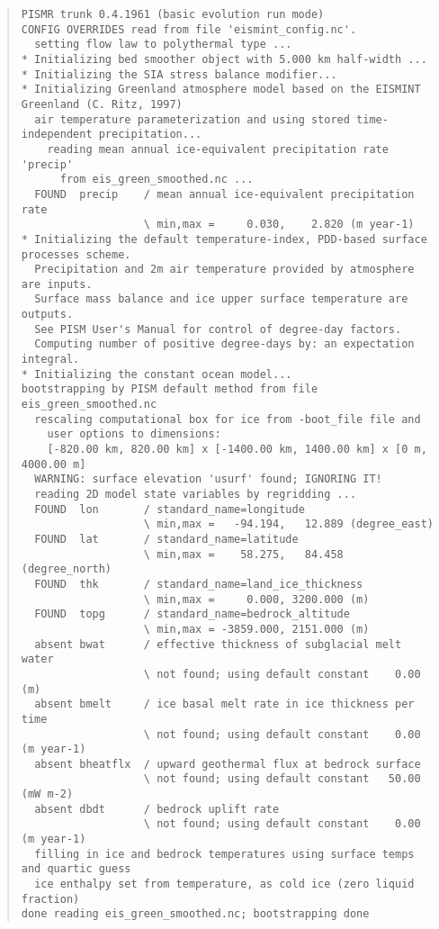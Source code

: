 \begin{table}
\centering
\scriptsize
\begin{quote}
\begin{verbatim}
PISMR trunk 0.4.1961 (basic evolution run mode)
CONFIG OVERRIDES read from file 'eismint_config.nc'.
  setting flow law to polythermal type ...
* Initializing bed smoother object with 5.000 km half-width ...
* Initializing the SIA stress balance modifier...
* Initializing Greenland atmosphere model based on the EISMINT Greenland (C. Ritz, 1997)
  air temperature parameterization and using stored time-independent precipitation...
    reading mean annual ice-equivalent precipitation rate 'precip'
      from eis_green_smoothed.nc ... 
  FOUND  precip    / mean annual ice-equivalent precipitation rate
                   \ min,max =     0.030,    2.820 (m year-1)
* Initializing the default temperature-index, PDD-based surface processes scheme.
  Precipitation and 2m air temperature provided by atmosphere are inputs.
  Surface mass balance and ice upper surface temperature are outputs.
  See PISM User's Manual for control of degree-day factors.
  Computing number of positive degree-days by: an expectation integral.
* Initializing the constant ocean model...
bootstrapping by PISM default method from file eis_green_smoothed.nc
  rescaling computational box for ice from -boot_file file and
    user options to dimensions:
    [-820.00 km, 820.00 km] x [-1400.00 km, 1400.00 km] x [0 m, 4000.00 m]
  WARNING: surface elevation 'usurf' found; IGNORING IT!
  reading 2D model state variables by regridding ...
  FOUND  lon       / standard_name=longitude 
                   \ min,max =   -94.194,   12.889 (degree_east)
  FOUND  lat       / standard_name=latitude  
                   \ min,max =    58.275,   84.458 (degree_north)
  FOUND  thk       / standard_name=land_ice_thickness
                   \ min,max =     0.000, 3200.000 (m)
  FOUND  topg      / standard_name=bedrock_altitude
                   \ min,max = -3859.000, 2151.000 (m)
  absent bwat      / effective thickness of subglacial melt water
                   \ not found; using default constant    0.00 (m)
  absent bmelt     / ice basal melt rate in ice thickness per time
                   \ not found; using default constant    0.00 (m year-1)
  absent bheatflx  / upward geothermal flux at bedrock surface
                   \ not found; using default constant   50.00 (mW m-2)
  absent dbdt      / bedrock uplift rate
                   \ not found; using default constant    0.00 (m year-1)
  filling in ice and bedrock temperatures using surface temps and quartic guess
  ice enthalpy set from temperature, as cold ice (zero liquid fraction)
done reading eis_green_smoothed.nc; bootstrapping done
\end{verbatim}
\end{quote}
\normalsize
\bigskip
\caption{Output of bootstrapping command.  Continues in Table \ref{bootCONTINUED}.}
\label{bootstrapEISgreen}
\end{table}

